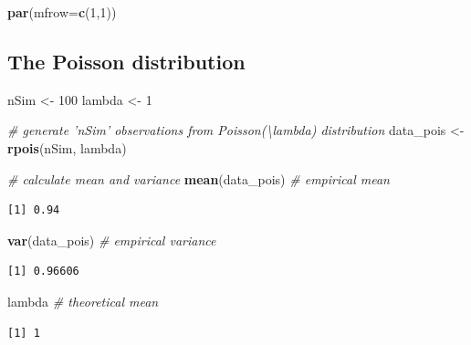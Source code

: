 \documentclass[
]{book}
\newenvironment{Shaded}{\begin{snugshade}}{\end{snugshade}}
\newcommand{\CommentTok}[1]{\textcolor[rgb]{0.56,0.35,0.01}{\textit{#1}}}
\newcommand{\DataTypeTok}[1]{\textcolor[rgb]{0.13,0.29,0.53}{#1}}
\newcommand{\DecValTok}[1]{\textcolor[rgb]{0.00,0.00,0.81}{#1}}
\newcommand{\KeywordTok}[1]{\textcolor[rgb]{0.13,0.29,0.53}{\textbf{#1}}}
\newcommand{\NormalTok}[1]{#1}
\newcommand{\StringTok}[1]{\textcolor[rgb]{0.31,0.60,0.02}{#1}}
\begin{document}
\begin{Shaded}
\begin{Highlighting}[]
\KeywordTok{par}\NormalTok{(}\DataTypeTok{mfrow=}\KeywordTok{c}\NormalTok{(}\DecValTok{1}\NormalTok{,}\DecValTok{1}\NormalTok{))}
\end{Highlighting}
\end{Shaded}

\hypertarget{the-poisson-distribution}{%
\subsection{The Poisson distribution}\label{the-poisson-distribution}}

\begin{Shaded}
\begin{Highlighting}[]
\NormalTok{nSim 	 <-}\StringTok{ }\DecValTok{100}
\NormalTok{lambda <-}\StringTok{ }\DecValTok{1}

\CommentTok{# generate 'nSim' observations from Poisson(\textbackslash{}lambda) distribution}
\NormalTok{data_pois <-}\StringTok{ }\KeywordTok{rpois}\NormalTok{(nSim, lambda)}

\CommentTok{# calculate mean and variance}
\KeywordTok{mean}\NormalTok{(data_pois) }\CommentTok{# empirical mean}
\end{Highlighting}
\end{Shaded}

\begin{verbatim}
[1] 0.94
\end{verbatim}

\begin{Shaded}
\begin{Highlighting}[]
\KeywordTok{var}\NormalTok{(data_pois)  }\CommentTok{# empirical variance}
\end{Highlighting}
\end{Shaded}

\begin{verbatim}
[1] 0.96606
\end{verbatim}

\begin{Shaded}
\begin{Highlighting}[]
\NormalTok{lambda	    }\CommentTok{# theoretical mean}
\end{Highlighting}
\end{Shaded}

\begin{verbatim}
[1] 1
\end{verbatim}
\end{document}
